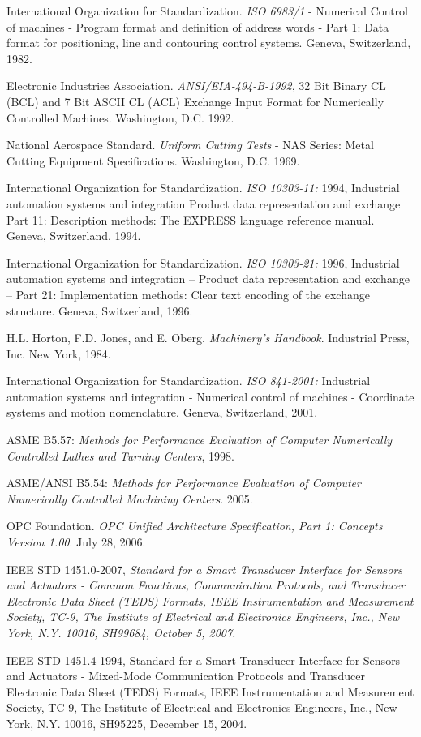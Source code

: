 \documentclass{mtconnect}	%
\begin{document}
International Organization for Standardization. \textit{ISO 6983/1} - Numerical Control of machines - Program format and definition of address words - Part 1: Data format for positioning, line and contouring control systems. Geneva, Switzerland, 1982.

Electronic Industries Association. \textit{ANSI/EIA-494-B-1992}, 32 Bit Binary CL (BCL) and 7 Bit ASCII CL (ACL) Exchange Input Format for Numerically Controlled Machines. Washington, D.C. 1992.

National Aerospace Standard. \textit{Uniform Cutting Tests} - NAS Series: Metal Cutting Equipment Specifications. Washington, D.C. 1969.

International Organization for Standardization. \textit{ISO 10303-11:} 1994, Industrial automation systems and integration  Product data representation and exchange  Part 11: Description methods: The EXPRESS language reference manual. Geneva, Switzerland, 1994.

International Organization for Standardization. \textit{ISO 10303-21:} 1996, Industrial automation systems and integration -- Product data representation and exchange -- Part 21: Implementation methods: Clear text encoding of the exchange structure. Geneva, Switzerland, 1996.

H.L. Horton, F.D. Jones, and E. Oberg. \textit{Machinery's Handbook}. Industrial Press, Inc. New York, 1984.

International Organization for Standardization. \textit{ISO 841-2001:} Industrial automation systems and integration - Numerical control of machines - Coordinate systems and motion nomenclature. Geneva, Switzerland, 2001.

ASME B5.57: \textit{Methods for Performance Evaluation of Computer Numerically Controlled Lathes and Turning Centers}, 1998.

ASME/ANSI B5.54: \textit{Methods for Performance Evaluation of Computer Numerically Controlled Machining Centers}. 2005.

OPC Foundation. \textit{OPC Unified Architecture Specification, Part 1: Concepts Version 1.00}. July 28, 2006.

IEEE STD 1451.0-2007, \textit{Standard for a Smart Transducer Interface for Sensors and Actuators - Common Functions, Communication Protocols, and Transducer Electronic Data Sheet (TEDS) Formats, IEEE Instrumentation and Measurement Society, TC-9, The Institute of Electrical and Electronics Engineers, Inc., New York, N.Y. 10016, SH99684, October 5, 2007.}

IEEE STD 1451.4-1994, Standard for a Smart Transducer Interface for Sensors and Actuators - Mixed-Mode Communication Protocols and Transducer Electronic Data Sheet (TEDS) Formats, IEEE Instrumentation and Measurement Society, TC-9, The Institute of Electrical and Electronics Engineers, Inc., New York, N.Y. 10016, SH95225, December 15, 2004. 
\end{document}

